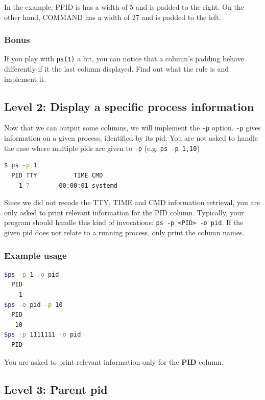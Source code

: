 \documentclass[12pt]{article}
\begin{document}
In the example, PPID is has a width of 5 and is padded to the right. On the other hand, COMMAND has a width of 27 and is padded to the left.

\subsubsection{Bonus}

If you play with \texttt{ps(1)} a bit, you can notice that a column's padding behave differently if it the last column displayed. Find out what the rule is and implement it.

\subsection{Level 2: Display a specific process information}

Now that we can output some columns, we will implement the \texttt{-p} option. \texttt{-p} gives information on a given process, identified by its pid. You are not asked to handle the case where multiple pids are given to \texttt{-p} (e.g. \texttt{ps -p 1,10})

\begin{lstlisting}[language=bash]
$ ps -p 1
  PID TTY          TIME CMD
    1 ?        00:00:01 systemd
\end{lstlisting}

Since we did not recode the TTY, TIME and CMD information retrieval, you are only asked to print relevant information for the PID column. Typically, your program should handle this kind of invocations: \texttt{ps -p <PID> -o pid}.
If the given pid does not relate to a running process, only print the column names.

\subsubsection{Example usage}

\begin{lstlisting}[language=bash]
$ps -p 1 -o pid
  PID
    1
$ps -o pid -p 10
  PID
   10
$ps -p 1111111 -o pid
  PID
\end{lstlisting}

You are asked to print relevant information only for the \textbf{PID} column.

\subsection{Level 3: Parent pid}
\end{document}
